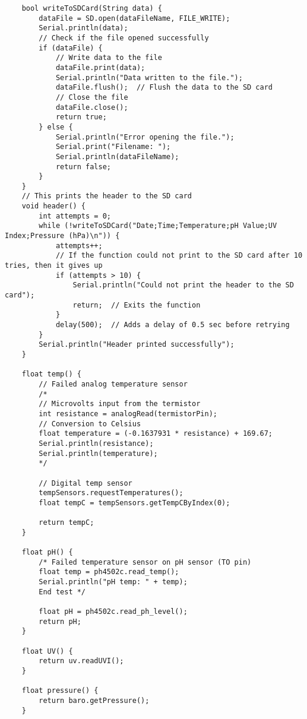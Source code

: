 \begin{lstlisting}
	bool writeToSDCard(String data) {
		dataFile = SD.open(dataFileName, FILE_WRITE);
		Serial.println(data);
		// Check if the file opened successfully
		if (dataFile) {
			// Write data to the file
			dataFile.print(data);
			Serial.println("Data written to the file.");
			dataFile.flush();  // Flush the data to the SD card
			// Close the file
			dataFile.close();
			return true;
		} else {
			Serial.println("Error opening the file.");
			Serial.print("Filename: ");
			Serial.println(dataFileName);
			return false;
		}
	}
	// This prints the header to the SD card
	void header() {
		int attempts = 0;
		while (!writeToSDCard("Date;Time;Temperature;pH Value;UV Index;Pressure (hPa)\n")) {
			attempts++;
			// If the function could not print to the SD card after 10 tries, then it gives up
			if (attempts > 10) {
				Serial.println("Could not print the header to the SD card");
				return;  // Exits the function
			}
			delay(500);  // Adds a delay of 0.5 sec before retrying
		}
		Serial.println("Header printed successfully");
	}
	
	float temp() {
		// Failed analog temperature sensor
		/*
		// Microvolts input from the termistor
		int resistance = analogRead(termistorPin);
		// Conversion to Celsius
		float temperature = (-0.1637931 * resistance) + 169.67;
		Serial.println(resistance);
		Serial.println(temperature);
		*/
		
		// Digital temp sensor
		tempSensors.requestTemperatures();
		float tempC = tempSensors.getTempCByIndex(0);
		
		return tempC;
	}
	
	float pH() {  
		/* Failed temperature sensor on pH sensor (TO pin)
		float temp = ph4502c.read_temp();
		Serial.println("pH temp: " + temp); 
		End test */
		
		float pH = ph4502c.read_ph_level();
		return pH;
	}
	
	float UV() {
		return uv.readUVI();
	}
	
	float pressure() {
		return baro.getPressure();
	}
\end{lstlisting}